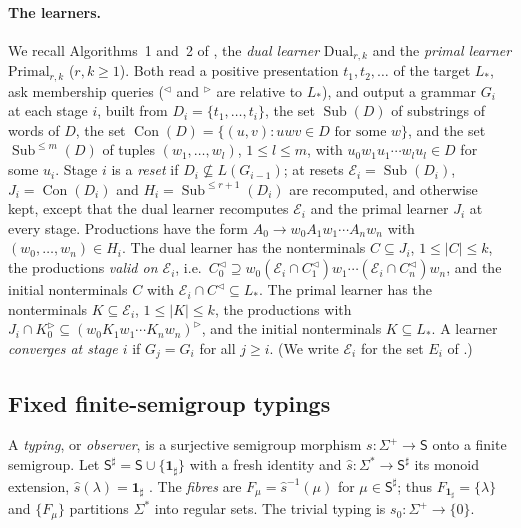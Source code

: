 \documentclass[11pt]{article}
\numberwithin{equation}{section}
\theoremstyle{plain}
\theoremstyle{definition}
\theoremstyle{remark}
\theoremstyle{plain}
\newcommand{\eps}{\lambda}
\newcommand{\R}{^{\rhd}}
\newcommand{\Lc}{^{\lhd}}
\newcommand{\Sub}{\operatorname{Sub}}
\newcommand{\Con}{\operatorname{Con}}
\newcommand{\one}{\mathbf 1_\sharp}
\begin{document}
\paragraph{The learners.}
We recall Algorithms~1 and~2 of \citet{ky2017}, the \emph{dual learner}
$\mathrm{Dual}_{r,k}$ and the \emph{primal learner} $\mathrm{Primal}_{r,k}$
($r,k\ge1$).  Both read a positive presentation $t_1,t_2,\dots$ of the target
$L_*$, ask membership queries ($\Lc$ and $\R$ are relative to $L_*$), and
output a grammar $G_i$ at each stage $i$, built from $D_i=\{t_1,\dots,t_i\}$,
the set $\Sub(D)$ of substrings of words of $D$, the set
$\Con(D)=\{(u,v):uwv\in D\text{ for some }w\}$, and the set $\Sub^{\le m}(D)$
of tuples $(w_1,\dots,w_l)$, $1\le l\le m$, with $u_0w_1u_1\cdots w_lu_l\in D$
for some $u_i$.  Stage $i$ is a \emph{reset} if $D_i\not\subseteq L(G_{i-1})$;
at resets $\mathcal E_i=\Sub(D_i)$, $J_i=\Con(D_i)$ and
$H_i=\Sub^{\le r+1}(D_i)$ are recomputed, and otherwise kept, except that the
dual learner recomputes $\mathcal E_i$ and the primal learner $J_i$ at every
stage.  Productions have the form $A_0\to w_0A_1w_1\cdots A_nw_n$ with
$(w_0,\dots,w_n)\in H_i$.  The dual learner has the nonterminals
$C\subseteq J_i$, $1\le|C|\le k$, the productions \emph{valid on $\mathcal
E_i$}, i.e.\ $C_0\Lc\supseteq w_0(\mathcal E_i\cap C_1\Lc)w_1\cdots(\mathcal
E_i\cap C_n\Lc)w_n$, and the initial nonterminals $C$ with $\mathcal E_i\cap
C\Lc\subseteq L_*$.  The primal learner has the nonterminals
$K\subseteq\mathcal E_i$, $1\le|K|\le k$, the productions with $J_i\cap
K_0\R\subseteq(w_0K_1w_1\cdots K_nw_n)\R$, and the initial nonterminals
$K\subseteq L_*$.  A learner \emph{converges at stage $i$} if $G_j=G_i$ for
all $j\ge i$.  (We write $\mathcal E_i$ for the set $E_i$ of \citet{ky2017}.)

\subsection*{Fixed finite-semigroup typings}
A \emph{typing}, or \emph{observer}, is a surjective semigroup morphism
$s:\Sigma^+\to\mathsf S$ onto a finite semigroup.  Let $\mathsf S^\sharp=\mathsf S\cup\{\one\}$ with a
fresh identity and $\widehat s:\Sigma^*\to\mathsf S^\sharp$ its monoid
extension, $\widehat s(\eps)=\one$ \citep[Lemma~2.2]{kuriyama-tcs1}.  The
\emph{fibres} are $F_\mu=\widehat s^{-1}(\mu)$ for $\mu\in\mathsf S^\sharp$;
thus $F_{\one}=\{\eps\}$ and $\{F_\mu\}$ partitions $\Sigma^*$ into regular
sets.  The trivial typing is $s_0:\Sigma^+\to\{0\}$.
\end{document}
